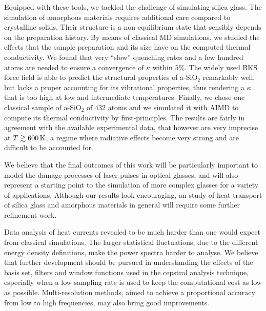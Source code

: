 Equipped with these tools, we tackled the challenge of simulating silica glass. 
The simulation of amorphous materials requires additional care compared to crystalline solids. Their structure is a non-equilibrium state that sensibly depends on the preparation history. 
By means of classical MD simulations, we studied the effects that the sample preparation and its size have on the computed thermal conductivity. We found that very ``slow'' quenching rates and a few hundred atoms are needed to ensure a convergence of $\kappa$ within $5\%$. 
The widely used BKS force field is able to predict the structural properties of a-SiO$_2$ remarkably well, but lacks a proper accounting for its vibrational properties, thus rendering a $\kappa$ that is too high at low and intermediate temperatures. 
Finally, we chose one classical sample of a-SiO$_2$ of $432$ atoms and we simulated it with AIMD to compute its thermal conductivity by first-principles. 
The results are fairly in agreement with the available experimental data, that however are very imprecise at $T \gtrsim 600\,\mathrm{K}$, a regime where radiative effects become very strong and are difficult to be accounted for. 

\medskip
We believe that the final outcomes of this work will be particularly important to model the damage processes of laser pulses in optical glasses, and will also represent a starting point to the simulation of more complex glasses for a variety of applications. 
Although our results look encouraging, an \abinitio study of heat transport of silica glass and amorphous materials in general will require some further refinement work. 

Data analysis of \abinitio heat currents revealed to be much harder than one would expect from classical simulations. The larger statistical fluctuations, due to the different energy density definitions, make the power spectra harder to analyse. 
We believe that further development should be pursued in understanding the effects of the basis set, filters and window functions used in the cepstral analysis technique, especially when a low sampling rate is used to keep the computational cost as low as possible. 
Multi-resolution methods, aimed to achieve a proportional accuracy from low to high frequencies, may also bring good improvements. 

